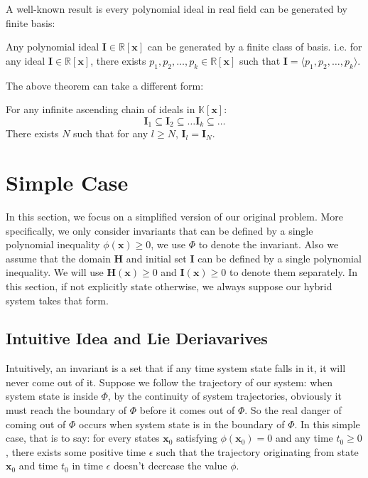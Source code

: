 \documentclass{article}
\begin{document}
A well-known result is every polynomial ideal in real field can be generated by finite basis: 

\begin{Theorem}
Any polynomial ideal $\boldsymbol{I} \in \mathbb{R}[\boldsymbol{x}]$ can be generated by a finite class of basis. i.e. for any ideal $\boldsymbol{I} \in \mathbb{R}[\boldsymbol{x}]$, there exists $p_1, p_2, \dots, p_k \in \mathbb{R}[\boldsymbol{x}]$ such that $\boldsymbol{I} = \langle p_1, p_2, \dots, p_k \rangle$.
\end{Theorem}

The above theorem can take a different form: 
\begin{Theorem}
\label{thm:ascendingChain}
For any infinite ascending chain of ideals in $\mathbb{K}[\boldsymbol{x}]$:
	\begin{equation*}
		\boldsymbol{I}_1 \subseteq \boldsymbol{I}_2 \subseteq \dots \boldsymbol{I}_k \subseteq \dots
	\end{equation*}
There exists $N$ such that for any $l \geq N$, $\boldsymbol{I}_l = \boldsymbol{I}_N$.
\end{Theorem}

\section{Simple Case}
\label{sec:simple}
In this section, we focus on a simplified version of our original problem. More specifically, we only consider invariants that can be defined by a single polynomial inequality $\phi(\boldsymbol{x}) \geq 0$, we use $\Phi$ to denote the invariant. Also we assume that the domain $\boldsymbol{H}$ and initial set $\boldsymbol{I}$ can be defined by a single polynomial inequality. We will use $\boldsymbol{H}(\boldsymbol{x}) \geq 0$ and $\boldsymbol{I}(\boldsymbol{x}) \geq 0$ to denote them separately. In this section, if not explicitly state otherwise, we always suppose our hybrid system takes that form.

\subsection{Intuitive Idea and Lie Deriavarives}
Intuitively, an invariant is a set that if any time system state falls in it, it will never come out of it. Suppose we follow the trajectory of our system: when system state is inside  $\Phi$, by the continuity of system trajectories, obviously it must reach the boundary of $\Phi$ before it comes out of $\Phi$. So the real danger of coming out of $\Phi$ occurs when system state is in the boundary of $\Phi$. In this simple case, that is to say: for every states $\boldsymbol{x}_0$ satisfying $\phi(\boldsymbol{x}_0) = 0$ and any time $t_0 \geq 0$, there exists some positive time $\epsilon$ such that the trajectory originating from state $\boldsymbol{x}_0$ and time $t_0$ in time $\epsilon$ doesn't decrease the value $\phi$. 
\end{document}
